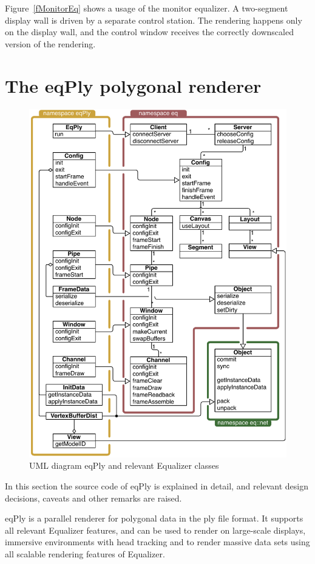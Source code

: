 \documentclass[10pt,a4]{scrartcl}
\newcommand{\fig}[1]{Figure~\ref{#1}}
\begin{document}
\fig{fMonitorEq} shows a usage of the monitor equalizer. A two-segment
display wall is driven by a separate control station. The rendering
happens only on the display wall, and the control window receives the
correctly downscaled version of the rendering.

\section{\label{sEqPly}The eqPly polygonal renderer}

\begin{figure}[ht!]\center
  \includegraphics[width=.9\textwidth]{images/uml}
  {\caption{\label{fUml}UML diagram eqPly and relevant Equalizer classes}}
\end{figure}

In this section the source code of \textsf{eqPly} is explained in
detail, and relevant design decisions, caveats and other remarks are
raised.

\textsf{eqPly} is a parallel renderer for polygonal data in the
\textsf{ply} file format. It supports all relevant Equalizer features,
and can be used to render on large-scale displays, immersive
environments with head tracking and to render massive data sets using
all scalable rendering features of Equalizer.
\end{document}
